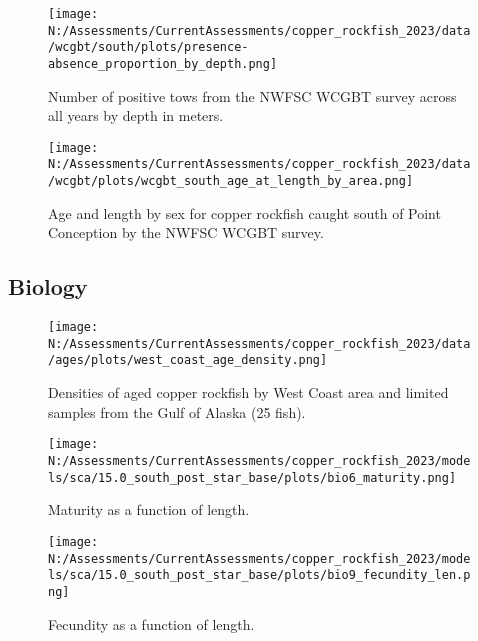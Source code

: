 \documentclass[11pt,
  english,
  letterpaper,
]{article}
\begin{document}
\pagebreak

\begin{figure}
\centering
\texttt{[image: N:/Assessments/CurrentAssessments/copper\_rockfish\_2023/data/wcgbt/south/plots/presence-absence\_proportion\_by\_depth.png]}
\caption{Number of positive tows from the NWFSC WCGBT survey across all years by depth in meters.\label{fig:wcgbt-depth}}
\end{figure}

\pagebreak

\begin{figure}
\centering
\texttt{[image: N:/Assessments/CurrentAssessments/copper\_rockfish\_2023/data/wcgbt/plots/wcgbt\_south\_age\_at\_length\_by\_area.png]}
\caption{Age and length by sex for copper rockfish caught south of Point Conception by the NWFSC WCGBT survey.\label{fig:wcgbt-len-age}}
\end{figure}

\pagebreak

\hypertarget{biology}{%
\subsection{Biology}\label{biology}}

\begin{figure}
\centering
\texttt{[image: N:/Assessments/CurrentAssessments/copper\_rockfish\_2023/data/ages/plots/west\_coast\_age\_density.png]}
\caption{Densities of aged copper rockfish by West Coast area and limited samples from the Gulf of Alaska (25 fish).\label{fig:west-coast-age-density}}
\end{figure}

\pagebreak

\begin{figure}
\centering
\texttt{[image: N:/Assessments/CurrentAssessments/copper\_rockfish\_2023/models/sca/15.0\_south\_post\_star\_base/plots/bio6\_maturity.png]}
\caption{Maturity as a function of length.\label{fig:maturity}}
\end{figure}

\pagebreak

\begin{figure}
\centering
\texttt{[image: N:/Assessments/CurrentAssessments/copper\_rockfish\_2023/models/sca/15.0\_south\_post\_star\_base/plots/bio9\_fecundity\_len.png]}
\caption{Fecundity as a function of length.\label{fig:fecundity}}
\end{figure}
\end{document}
